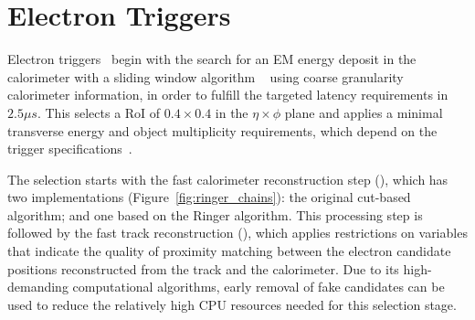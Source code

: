 \section{Electron Triggers}\label{ssec:egamma_trigger}


Electron triggers~\cite{aad2020performance} begin with
the search for an EM energy deposit in the calorimeter with a \licalo{} sliding
window algorithm ~\cite{Franchino:2730851} using coarse granularity calorimeter information, in order to
fulfill the targeted latency requirements in $2.5\mu s$. This selects a RoI of $0.4\times 0.4$
in the $\eta\times\phi$ plane and applies a minimal transverse energy and object
multiplicity requirements, which depend on the trigger
specifications~\cite{TRIG-2016-01}.
 
The \hlt{} selection starts with the fast calorimeter reconstruction
step (\fastcalo), which has two implementations
(Figure~\ref{fig:ringer_chains}): the original cut-based algorithm; and one based on the Ringer algorithm. 
This processing step is followed by the fast track reconstruction
(\fastelectron), which applies restrictions on variables that indicate the quality of proximity matching between the electron candidate positions reconstructed from the track and the calorimeter. Due to its high-demanding computational algorithms, early removal of fake candidates can be used to reduce the relatively high CPU resources needed for this selection stage.



